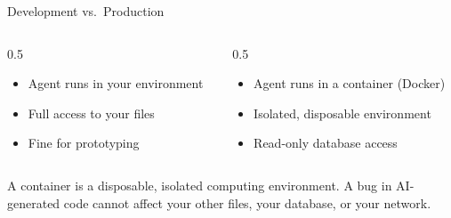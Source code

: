 \documentclass[aspectratio=169]{beamer}
\begin{document}
\begin{frame}{Development vs.\ Production}
\begin{columns}[T]
\begin{column}{0.5\textwidth}
\begin{shadedbox}[title=\textbf{Development (Your Laptop)}]
\begin{itemize}\small
  \item Agent runs in your environment
  \item Full access to your files
  \item Fine for prototyping
\end{itemize}
\end{shadedbox}
\end{column}
\begin{column}{0.5\textwidth}
\begin{shadedbox}[title=\textbf{Production}]
\begin{itemize}\small
  \item Agent runs in a \alert{container} (Docker)
  \item Isolated, disposable environment
  \item Read-only database access
\end{itemize}
\end{shadedbox}
\end{column}
\end{columns}
\vspace{0.3cm}
A container is a disposable, isolated computing environment.  A bug in AI-generated code cannot affect your other files, your database, or your network.
\end{frame}
\end{document}
